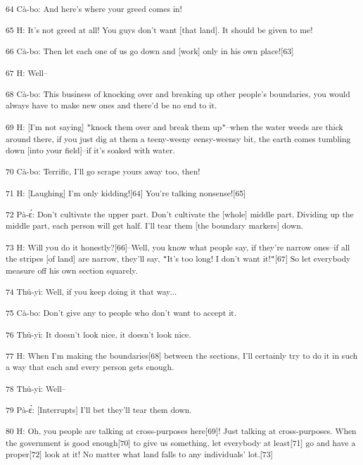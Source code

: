 {\textsuperscript{64 Cà-bo: And here's where your greed comes in!}}

{\textsuperscript{65 H: It's not greed at all! You guys don't want [that
land]. It should be given to me!}}

{\textsuperscript{66 Cà-bo: Then let each one of us go down and [work]
only in his own place![63]}}

{\textsuperscript{67 H: Well--}}

{\textsuperscript{68 Cà-bo: This business of knocking over and breaking
up other people's boundaries, you would always have to make new ones and there'd
be no end to it.}}

{\textsuperscript{69 H: [I'm not saying] \texttt{"}knock them over and break
them up\texttt{"}--when the water weeds are thick around there, if you just dig
at them a teeny-weeny eensy-weensy bit, the earth comes tumbling down [into your
field]--if it's soaked with water. }}

{\textsuperscript{70 Cà-bo: Terrific, I'll go scrape yours away too, then!}}

{\textsuperscript{71 H: [Laughing] I'm only kidding![64] You're talking
nonsense![65]}}

{\textsuperscript{72 Pà-ɛ́: Don't cultivate the upper part. Don't cultivate
the [whole] middle part. Dividing up the middle part, each person will get half.
I'll tear them [the boundary markers] down.}}

{\textsuperscript{73 H: Will you do it honestly?[66]--Well, you know what
people say, if they're narrow ones--if all the stripes [of land] are narrow, they'll
say, \texttt{"}It's too long! I don't want it!\texttt{"}[67] So let everybody measure
off his own section squarely. }}

{\textsuperscript{74 Thû-yì: Well, if you keep doing it that way...}}

{\textsuperscript{75 Cà-bo: Don't give any to people who don't want to
accept it.}}

{\textsuperscript{76 Thû-yì: It doesn't look nice, it doesn't look nice.}}

{\textsuperscript{77 H: When I'm making the boundaries[68] between the sections,
I'll certainly try to do it in such a way that each and every person gets enough.}}

{\textsuperscript{78 Thû-yì: Well--}}

{\textsuperscript{79 Pà-ɛ́: [Interrupts] I'll bet they'll tear them down.}}

{\textsuperscript{80 H: Oh, you people are talking at cross-purposes here[69]!
Just talking at cross-purposes. When the government is good enough[70] to give
us something, let everybody at least[71] go and have a proper[72] look at it! No
matter what land falls to any individuals' lot.[73]}}

